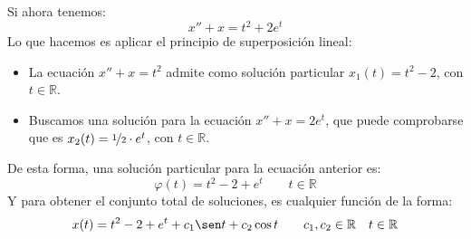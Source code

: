 \begin{ejemplo}
    Si ahora tenemos:
    \begin{equation*}
        x'' + x = t^2 + 2e^t
    \end{equation*}
    Lo que hacemos es aplicar el principio de superposición lineal:
    \begin{itemize}
        \item La ecuación $x'' + x = t^2$ admite como solución particular $x_1(t) = t^2 - 2$, con $t\in \mathbb{R}$.
        \item Buscamos una solución para la ecuación $x'' + x = 2e^t$, que puede comprobarse que es $x_2(t) = \nicefrac{1}{2}\cdot e^t$, con $t\in \mathbb{R}$.
    \end{itemize}
    De esta forma, una solución particular para la ecuación anterior es:
    \begin{equation*}
        \varphi(t) = t^2 - 2 + e^t \qquad t\in \mathbb{R}
    \end{equation*}
    Y para obtener el conjunto total de soluciones, es cualquier función de la forma:
    \begin{equation*}
        x(t) = t^2 - 2 + e^t + c_1 \sen t + c_2 \cos t \qquad c_1,c_2 \in \mathbb{R} \quad t\in \mathbb{R}
    \end{equation*}
\end{ejemplo}

